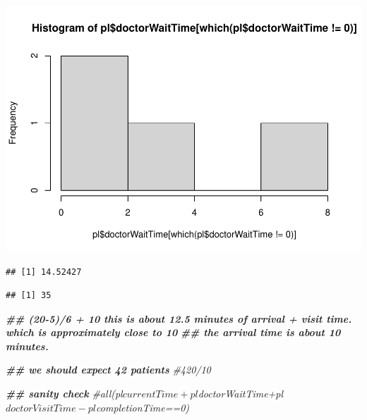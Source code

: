 \documentclass[
]{book}
\newenvironment{Shaded}{\begin{snugshade}}{\end{snugshade}}
\newcommand{\CommentTok}[1]{\textcolor[rgb]{0.56,0.35,0.01}{\textit{#1}}}
\newcommand{\DecValTok}[1]{\textcolor[rgb]{0.00,0.00,0.81}{#1}}
\newcommand{\DocumentationTok}[1]{\textcolor[rgb]{0.56,0.35,0.01}{\textbf{\textit{#1}}}}
\newcommand{\FunctionTok}[1]{\textcolor[rgb]{0.00,0.00,0.00}{#1}}
\newcommand{\NormalTok}[1]{#1}
\newcommand{\SpecialCharTok}[1]{\textcolor[rgb]{0.00,0.00,0.00}{#1}}
\theoremstyle{definition}
\theoremstyle{definition}
\theoremstyle{definition}
\theoremstyle{definition}
\theoremstyle{remark}
\begin{document}
\includegraphics{_main_files/figure-latex/unnamed-chunk-9-3.pdf}

\begin{Shaded}
\end{Shaded}

\begin{verbatim}
## [1] 14.52427
\end{verbatim}

\begin{Shaded}
\end{Shaded}

\begin{verbatim}
## [1] 35
\end{verbatim}

\begin{Shaded}
\begin{Highlighting}[]
\DocumentationTok{\#\# (20{-}5)/6 + 10 this is about 12.5 minutes of arrival + visit time. which is approximately close to 10 }
\DocumentationTok{\#\# the arrival time is about 10 minutes.  }

\DocumentationTok{\#\# we should expect 42 patients}
 \CommentTok{\#420/10}
  
  \DocumentationTok{\#\# sanity check}
  \CommentTok{\#all(pl$currentTime+pl$doctorWaitTime+pl$doctorVisitTime{-}pl$completionTime==0)}
\end{Highlighting}
\end{Shaded}
\end{document}
